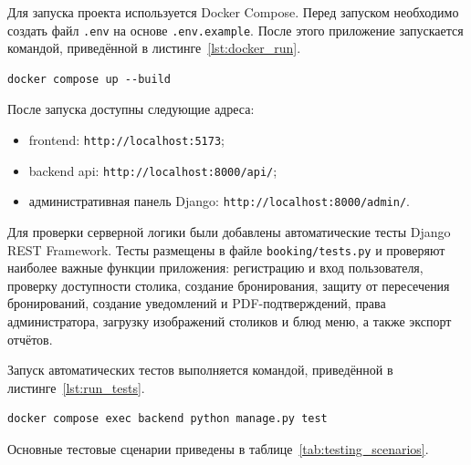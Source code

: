 Для запуска проекта используется Docker Compose. Перед запуском необходимо создать
файл \texttt{.env} на основе \texttt{.env.example}. После этого приложение запускается
командой, приведённой в листинге~\ref{lst:docker_run}.

\begin{lstlisting}[caption={Запуск приложения}, label={lst:docker_run}]
docker compose up --build
\end{lstlisting}

После запуска доступны следующие адреса:

\begin{itemize}
  \item frontend: \texttt{http://localhost:5173};
  \item backend api: \texttt{http://localhost:8000/api/};
  \item административная панель Django: \texttt{http://localhost:8000/admin/}.
\end{itemize}

Для проверки серверной логики были добавлены автоматические тесты Django REST
Framework. Тесты размещены в файле \texttt{booking/tests.py} и проверяют наиболее
важные функции приложения: регистрацию и вход пользователя, проверку доступности
столика, создание бронирования, защиту от пересечения бронирований, создание
уведомлений и PDF-подтверждений, права администратора, загрузку изображений столиков
и блюд меню, а также экспорт отчётов.

Запуск автоматических тестов выполняется командой, приведённой в
листинге~\ref{lst:run_tests}.

\begin{lstlisting}[caption={Запуск автоматических тестов backend}, label={lst:run_tests}]
docker compose exec backend python manage.py test
\end{lstlisting}

Основные тестовые сценарии приведены в таблице~\ref{tab:testing_scenarios}.

